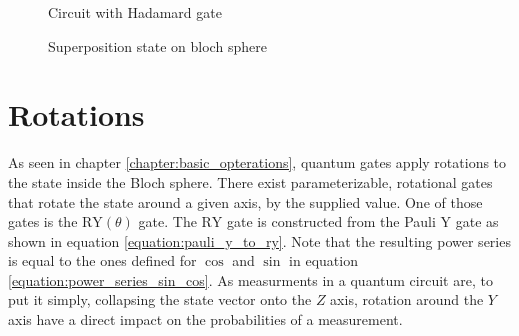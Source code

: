 \begin{figure}[!h]
    \centering
    \caption{Circuit with Hadamard gate}
    \label{fig:circuit_hadamard}
\end{figure}

\begin{figure}[!h]
    \centering
    \caption{Superposition state on bloch sphere}
    \label{fig:circuit_hadamard_bloch_sphere}
\end{figure}

\section{Rotations}
\label{chapter:rotations}

As seen in chapter \ref{chapter:basic_opterations}, quantum gates apply rotations to the state inside the Bloch sphere. There exist parameterizable, rotational gates that rotate the state around a given axis, by the supplied value. One of those gates is the $\mathrm{RY}(\theta)$ gate\cite{qiskit_rygate_nodate}. The $\mathrm{RY}$ gate is constructed from the Pauli $\mathrm{Y}$ gate as shown in equation \ref{equation:pauli_y_to_ry}. Note that the resulting power series is equal to the ones defined for $\cos$ and $\sin$ in equation \ref{equation:power_series_sin_cos}\cite{lars_complex_1978}. As measurments in a quantum circuit are, to put it simply, collapsing the state vector onto the $Z$ axis\cite{feynman_feynman_1965}, rotation around the $Y$ axis have a direct impact on the probabilities of a measurement.

